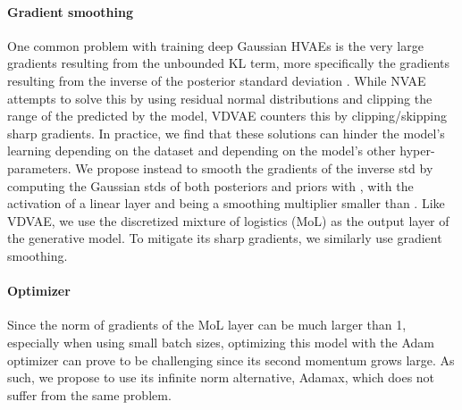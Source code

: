 \documentclass{article}
\begin{document}
\paragraph{Gradient smoothing} One common problem with training deep Gaussian HVAEs is the very large gradients resulting from the unbounded KL term\cite{child2021very, vahdat2020nvae}, more specifically the gradients resulting from the inverse of the posterior standard deviation . While NVAE attempts to solve this by using residual normal distributions and clipping the range of the  predicted by the model, VDVAE counters this by clipping/skipping sharp gradients. In practice, we find that these solutions can hinder the model's learning depending on the dataset and depending on the model's other hyper-parameters. We propose instead to smooth the gradients of the inverse std by computing the Gaussian stds of both posteriors and priors with , with  the activation of a linear layer and  being a smoothing multiplier smaller than . Like VDVAE, we use the discretized mixture of logistics (MoL) as the output layer of the generative model. To mitigate its sharp gradients, we similarly use gradient smoothing.

\paragraph{Optimizer} Since the norm of gradients of the MoL layer can be much larger than 1, especially when using small batch sizes, optimizing this model with the Adam optimizer \cite{kingma2017adam} can prove to be challenging since its second momentum  grows large. As such, we propose to use its infinite norm alternative, Adamax, which does not suffer from the same problem.
\end{document}
